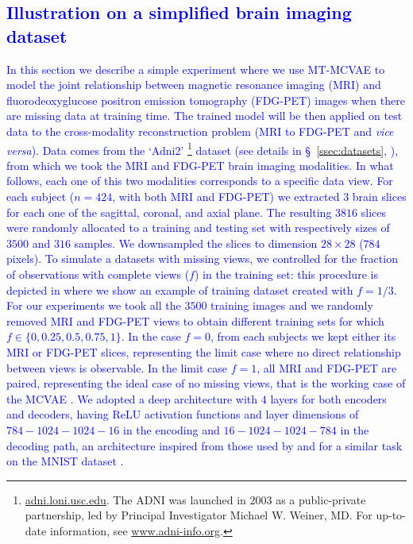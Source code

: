 \textcolor{blue}{
	\subsection{Illustration on a simplified brain imaging dataset}
	\label{sec:proof_of_concept}
	In this section we describe a simple experiment where we use MT-MCVAE to model the joint relationship between
	magnetic resonance imaging (MRI) and fluorodeoxyglucose positron emission tomography (FDG-PET) images when there are missing data at training time.
	The trained model will be then applied on test data
	to the cross-modality reconstruction problem (MRI to FDG-PET and \textit{vice versa}).
%	
	Data comes from the `Adni2'
	\footnote{
	\href{http://adni.loni.usc.edu}{adni.loni.usc.edu}.
	The ADNI was launched in 2003 as a public-private partnership, led by Principal Investigator Michael W. Weiner, MD. For up-to-date information, see \href{www.adni-info.org}{www.adni-info.org}.
	}
	dataset (see details in \S~\ref{ssec:datasets}, ), from which we took the MRI and FDG-PET brain imaging modalities.
	In what follows, each one of this two modalities corresponds to a specific data view.
	For each subject ($n=424$, with both MRI and FDG-PET) we extracted $3$ brain slices for each one of the sagittal, coronal, and axial plane.
	The resulting $3816$ slices were randomly allocated to a training and testing set with respectively sizes of $3500$ and $316$ samples.
	We downsampled the slices to dimension $28 \times 28$ ($784$ pixels).
	To simulate a datasets with missing views, we controlled for the fraction of observations with complete views ($f$) in the training set:
	this procedure is depicted in  where we show an example of training dataset created with $f=1/3$.
	For our experiments we took all the $3500$ training images and we randomly removed MRI and FDG-PET views to obtain different training sets for which $f \in \{0, 0.25, 0.5, 0.75, 1\}$.
	In the case $f = 0$, from each subjects we kept either its MRI or FDG-PET slices, representing the limit case where no direct relationship between views is observable.
	In the limit case $f = 1$, all MRI and FDG-PET are paired, representing the ideal case of no missing views, that is the working case of the MCVAE \citep{Antelmi2019}.
	We adopted a deep architecture with $4$ layers for both encoders and decoders, having ReLU activation functions and layer dimensions of $784-1024-1024-16$ in the encoding and $16-1024-1024-784$ in the decoding path,
	an architecture inspired from those used by \cite{dcca1} and \cite{dcca2} for a similar task on the MNIST dataset \citep{mnist}.
}
